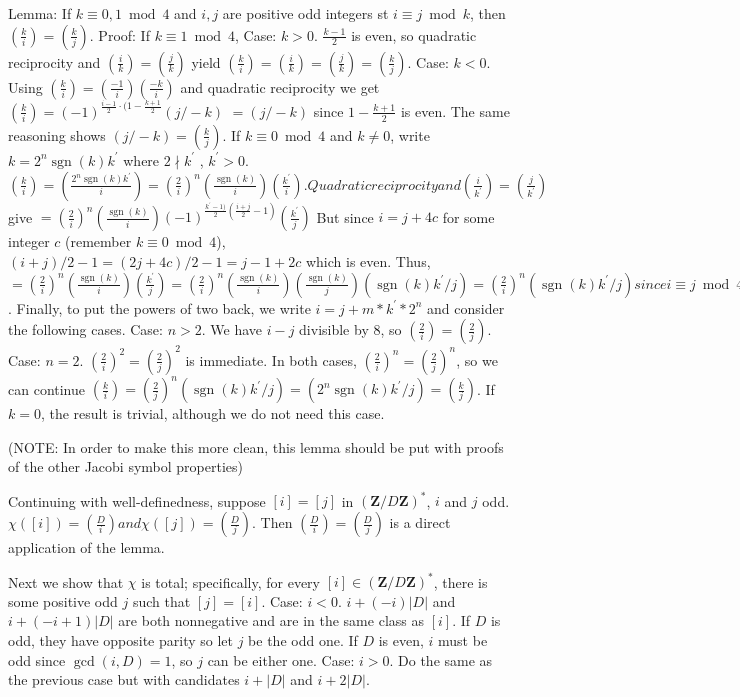 \documentclass[b5paper,12pt,oneside,openright]{memoir}
\DeclareMathOperator{\sgn}{sgn}
\begin{document}
Lemma: If $k\equiv 0,1\bmod 4$ and $i,j$ are positive odd integers st $i\equiv j\bmod k$, then $(\frac{k}{i}) = (\frac{k}{j})$.
Proof: If $k\equiv 1\bmod 4$,
          Case: $k>0$. $\frac{k-1}{2}$ is even, so quadratic reciprocity and $(\frac{i}{k}) = (\frac{j}{k})$ yield
          $(\frac{k}{i}) = (\frac{i}{k}) = (\frac{j}{k}) = (\frac{k}{j})$.
          Case: $k<0$. Using $(\frac{k}{i}) = (\frac{-1}{i})(\frac{-k}{i})$ and quadratic reciprocity we get
          $(\frac{k}{i}) = (-1)^{\frac{i-1}{2}\cdot(1-\frac{k+1}{2}} (j/-k)$
                $= (j/-k)$ since $1-\frac{k+1}{2}$ is even.
          The same reasoning shows $(j/-k) = (\frac{k}{j})$.
       If $k\equiv 0\bmod 4$ and $k\neq 0$, write $k = 2^n \sgn(k) k^\prime$  where
       $2 \nmid k^\prime$ , $k^\prime >0$.
       $(\frac{k}{i}) = (\frac{2^n \sgn(k) k^\prime}{i})
             = (\frac{2}{i})^n (\frac{\sgn(k)}{i}) (\frac{k^\prime }{i}). Quadratic reciprocity and (\frac{i}{k^\prime}) = (\frac{j}{k^\prime})$ give
             $= (\frac{2}{i})^n (\frac{\sgn(k)}{i}) (-1)^{\frac{k^\prime-1)}{2}\left(\frac{i+j}{2} - 1\right)} (\frac{k^\prime }{j})$
       But since $i = j + 4c$ for some integer $c$ (remember $k\equiv 0\bmod 4$),
       $(i+j)/2 - 1 = (2j + 4c)/2 - 1 = j - 1 + 2c$ which is even. Thus,
             $= (\frac{2}{i})^n (\frac{\sgn(k)}{i}) (\frac{k^\prime }{j})
             = (\frac{2}{i})^n (\frac{\sgn(k)}{i}) (\frac{\sgn(k)}{j}) (\sgn(k)k^\prime /j)
             = (\frac{2}{i})^n (\sgn(k)k^\prime /j) since i\equiv j\bmod 4$.
       Finally, to put the powers of two back, we write $i = j + m*k^\prime *2^n$ and consider the following cases.
          Case: $n>2$. We have $i-j$ divisible by 8, so $(\frac{2}{i}) = (\frac{2}{j})$.
          Case: $n=2$. $(\frac{2}{i})^2 = (\frac{2}{j})^2$ is immediate.
          In both cases, $(\frac{2}{i})^n = (\frac{2}{j})^n$, so we can continue
       $(\frac{k}{i}) = (\frac{2}{j})^n (\sgn(k)k^\prime /j)
             = (2^n \sgn(k) k^\prime /j)
             = (\frac{k}{j})$.
       If $k=0$, the result is trivial, although we do not need this case.

(NOTE: In order to make this more clean, this lemma should be put with proofs of the other Jacobi symbol properties)

Continuing with well-definedness, suppose $[i] = [j]$ in $(\mathbf{Z}/D\mathbf{Z})^*$, $i$ and $j$ odd. $\chi([i]) = (\frac{D}{i}) and \chi([j]) = (\frac{D}{j})$. Then $(\frac{D}{i}) = (\frac{D}{j})$ is a direct application of the lemma.

Next we show that $\chi$ is total; specifically, for every $[i]\in (\mathbf{Z}/D\mathbf{Z})^*$, there is some positive odd $j$ such that $[j] = [i]$.
  Case: $i < 0$. $i+(-i)|D|$ and $i+(-i+1)|D|$ are both nonnegative and are in the same class as $[i]$. If $D$ is odd, they have opposite parity so let $j$ be the odd one. If $D$ is even, $i$ must be odd since $\gcd(i,D)=1$, so $j$ can be either one.
  Case: $i > 0$. Do the same as the previous case but with candidates $i+|D|$ and $i+2|D|$.
\end{document}
